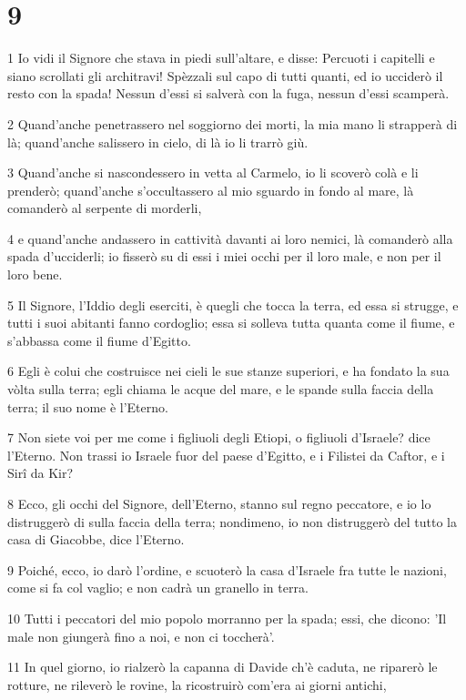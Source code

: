 \chapter{9}

\par 1 Io vidi il Signore che stava in piedi sull'altare, e disse: Percuoti i capitelli e siano scrollati gli architravi! Spèzzali sul capo di tutti quanti, ed io ucciderò il resto con la spada! Nessun d'essi si salverà con la fuga, nessun d'essi scamperà.
\par 2 Quand'anche penetrassero nel soggiorno dei morti, la mia mano li strapperà di là; quand'anche salissero in cielo, di là io li trarrò giù.
\par 3 Quand'anche si nascondessero in vetta al Carmelo, io li scoverò colà e li prenderò; quand'anche s'occultassero al mio sguardo in fondo al mare, là comanderò al serpente di morderli,
\par 4 e quand'anche andassero in cattività davanti ai loro nemici, là comanderò alla spada d'ucciderli; io fisserò su di essi i miei occhi per il loro male, e non per il loro bene.
\par 5 Il Signore, l'Iddio degli eserciti, è quegli che tocca la terra, ed essa si strugge, e tutti i suoi abitanti fanno cordoglio; essa si solleva tutta quanta come il fiume, e s'abbassa come il fiume d'Egitto.
\par 6 Egli è colui che costruisce nei cieli le sue stanze superiori, e ha fondato la sua vòlta sulla terra; egli chiama le acque del mare, e le spande sulla faccia della terra; il suo nome è l'Eterno.
\par 7 Non siete voi per me come i figliuoli degli Etiopi, o figliuoli d'Israele? dice l'Eterno. Non trassi io Israele fuor del paese d'Egitto, e i Filistei da Caftor, e i Sirî da Kir?
\par 8 Ecco, gli occhi del Signore, dell'Eterno, stanno sul regno peccatore, e io lo distruggerò di sulla faccia della terra; nondimeno, io non distruggerò del tutto la casa di Giacobbe, dice l'Eterno.
\par 9 Poiché, ecco, io darò l'ordine, e scuoterò la casa d'Israele fra tutte le nazioni, come si fa col vaglio; e non cadrà un granello in terra.
\par 10 Tutti i peccatori del mio popolo morranno per la spada; essi, che dicono: 'Il male non giungerà fino a noi, e non ci toccherà'.
\par 11 In quel giorno, io rialzerò la capanna di Davide ch'è caduta, ne riparerò le rotture, ne rileverò le rovine, la ricostruirò com'era ai giorni antichi,
